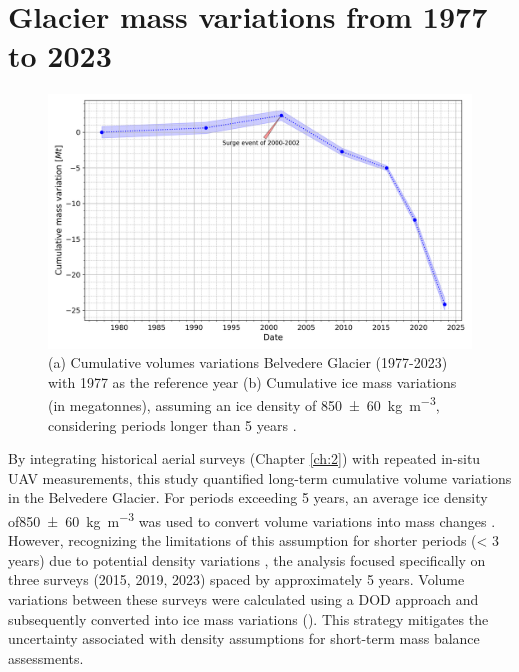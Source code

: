 \section{Glacier mass variations from 1977 to 2023}

\begin{figure}[ht]
  \centering
    \includegraphics[width=\textwidth]{cumulative_mass_changes_all.png}
    \caption{(a) Cumulative volumes variations Belvedere Glacier (1977-2023) with 1977 as the reference year (b) Cumulative ice mass variations (in megatonnes), assuming an ice density of \SI[separate-uncertainty = true]{850 \pm 60}{\kilo\gram\per\cubic\meter}, considering periods longer than 5 years \cite{Huss2013_density_geodetic_balance}. %
    } 
  \label{fig:3:cumulative_volumes_mass}
\end{figure}

By integrating historical aerial surveys (Chapter \ref{ch:2}) with repeated in-situ UAV measurements, this study quantified long-term cumulative volume variations in the Belvedere Glacier. %
For periods exceeding 5 years, an average ice density of\SI[separate-uncertainty = true]{850 \pm 60}{\kilo\gram\per\cubic\meter} was used to convert volume variations into mass changes \cite{Huss2013_density_geodetic_balance}. 
However, recognizing the limitations of this assumption for shorter periods (< 3 years) due to potential density variations \cite{Huss2013_density_geodetic_balance}, the analysis focused specifically on three surveys (2015, 2019, 2023) spaced by approximately 5 years. 
Volume variations between these surveys were calculated using a DOD approach and subsequently converted into ice mass variations  (). 
This strategy mitigates the uncertainty associated with density assumptions for short-term mass balance assessments.

